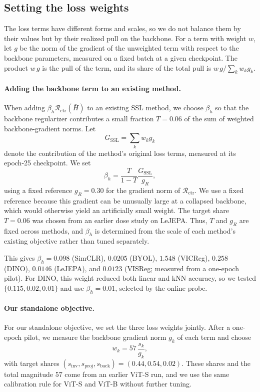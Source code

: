 \documentclass{article} %
\theoremstyle{remark}
\begin{document}
\subsection{Setting the loss weights}
\label{app:loss-weights}
The loss terms have different forms and scales, so we do not balance them by their values but by their realized pull on the backbone. For a term with weight $w$, let $g$ be the norm of the gradient of the unweighted term with respect to the backbone parameters, measured on a fixed batch at a given checkpoint. The product $w\,g$ is the pull of the term, and its share of the total pull is $w\,g/\sum_k w_k g_k$.

\paragraph{Adding the backbone term to an existing method.}
When adding $\beta_h\mathcal R_{\mathrm{ctr}}(\bar H)$ to an existing SSL method, we choose $\beta_h$ so that the backbone regularizer contributes a small fraction $T=0.06$ of the sum of weighted backbone-gradient norms. Let
\[
G_{\mathrm{SSL}}=\sum_k w_k g_k
\]
denote the contribution of the method's original loss terms, measured at its epoch-25 checkpoint. We set
\[
\beta_h=\frac{T}{1-T}\frac{G_{\mathrm{SSL}}}{g_R},
\]
using a fixed reference $g_R=0.30$ for the gradient norm of $\mathcal R_{\mathrm{ctr}}$. We use a fixed reference because this gradient can be unusually large at a collapsed backbone, which would otherwise yield an artificially small weight. The target share $T=0.06$ was chosen from an earlier dose study on LeJEPA. Thus, $T$ and $g_R$ are fixed across methods, and $\beta_h$ is determined from the scale of each method's existing objective rather than tuned separately.

This gives $\beta_h=0.098$ (SimCLR), $0.0205$ (BYOL), $1.548$ (VICReg), $0.258$ (DINO), $0.0146$ (LeJEPA), and $0.0123$ (VISReg; measured from a one-epoch pilot). For DINO, this weight reduced both linear and kNN accuracy, so we tested $\{0.115,0.02,0.01\}$ and use $\beta_h=0.01$, selected by the online probe.

\paragraph{Our standalone objective.}
For our standalone objective, we set the three loss weights jointly. After a one-epoch pilot, we measure the backbone gradient norm $g_k$ of each term and choose
\[
w_k = 57\,\frac{s_k}{g_k},
\]
with target shares $(s_{\mathrm{inv}},s_{\mathrm{proj}},s_{\mathrm{back}})=(0.44,0.54,0.02)$. These shares and the total magnitude $57$ come from an earlier ViT-S run, and we use the same calibration rule for ViT-S and ViT-B without further tuning.
\end{document}

